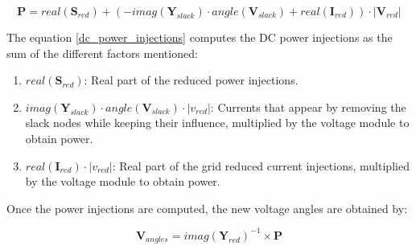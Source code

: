 \documentclass[a4paper,twoside,fleqn]{tufte-book}
\begin{document}
%
%
%
%
%
%
%
%
%

\begin{equation}
\textbf{P} = real(\textbf{S}_{red}) + (- imag(\textbf{Y}_{slack}) \cdot angle(\textbf{V}_{slack}) + real(\textbf{I}_{red})) \cdot |\textbf{V}_{red}|
\label{dc_power_injections}
\end{equation}

The equation \ref{dc_power_injections} computes the DC power injections as the sum of the different factors mentioned:

\begin{enumerate}
	\item $real(\textbf{S}_{red})$: Real part of the reduced power injections.
	\item $imag(\textbf{Y}_{slack}) \cdot angle(\textbf{V}_{slack}) \cdot |v_{red}|$: Currents that appear by removing the slack nodes while keeping their influence, multiplied by the voltage module to obtain power.
	\item $real(\textbf{I}_{red}) \cdot |v_{red}|$: Real part of the grid reduced current injections, multiplied by the voltage module to obtain power.
\end{enumerate}

Once the power injections are computed, the new voltage angles are obtained by:

\begin{equation}
\textbf{V}_{angles} = imag(\textbf{Y}_{red})^{-1} \times \textbf{P}
\end{equation}
\end{document}
